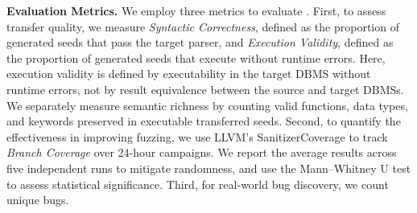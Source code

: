 \documentclass[conference]{IEEEtran}
\begin{document}
\textbf{Evaluation Metrics.}
We employ three metrics to evaluate \tool{}.
First, to assess transfer quality, we measure \textit{Syntactic Correctness}, defined as the proportion of generated seeds that pass the target parser, and \textit{Execution Validity}, defined as the proportion of generated seeds that execute without runtime errors.
Here, execution validity is defined by executability in the target DBMS without runtime errors, not by result equivalence between the source and target DBMSs.
We separately measure semantic richness by counting valid functions, data types, and keywords preserved in executable transferred seeds.
Second, to quantify the effectiveness in improving fuzzing, we use LLVM's SanitizerCoverage to track \textit{Branch Coverage} over 24-hour campaigns.
We report the average results across five independent runs to mitigate randomness, and use the Mann--Whitney U test to assess statistical significance.
Third, for real-world bug discovery, we count unique bugs.
\end{document}
